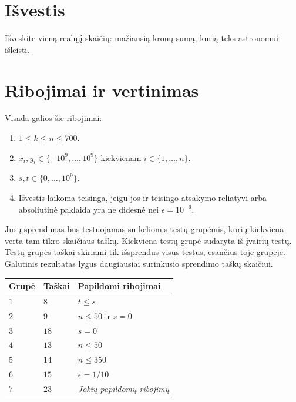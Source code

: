 \section*{Išvestis}

Išveskite vieną realųjį skaičių: mažiausią kronų sumą, kurią teks astronomui išleisti.

\section*{Ribojimai ir vertinimas}

Visada galios šie ribojimai:
\begin{enumerate}
\item $1\leq k\leq n\leq 700$. %
\item $x_i, y_i\in \{-10^9,\ldots, 10^9\}$ kiekvienam $i\in\{1,\ldots,n\}$. %
\item $s,t\in \{0,\ldots, 10^9\}$. %
\item Išvestis laikoma teisinga, jeigu jos ir teisingo atsakymo
reliatyvi arba absoliutinė paklaida yra ne didesnė nei $\epsilon = 10^{-6}$.
\end{enumerate}

Jūsų sprendimas bus testuojamas su keliomis testų grupėmis, kurių kiekviena verta tam tikro skaičiaus taškų.
Kiekviena testų grupė sudaryta iš įvairių testų.
Testų grupės taškai skiriami tik išsprendus visus testus, esančius toje grupėje.
Galutinis rezultatas lygus daugiausiai surinkusio sprendimo taškų skaičiui.

\medskip
\noindent
\begin{tabular}{lll}
  Grupė & Taškai & Papildomi ribojimai\\\hline
  $1$ & $8$ &  $t\leq s$\\
  $2$ & $9$ & $n\le 50$ ir $s=0$\\
  $3$ & $18$ & $s=0$\\
  $4$ & $13$ & $n\leq 50$\\
  $5$ & $14$ & $n\leq 350$\\
  $6$ & $15$ & $\epsilon = 1/10$\\
  $7$ & $23$ & \emph{Jokių papildomų ribojimų}\\
\end{tabular}
